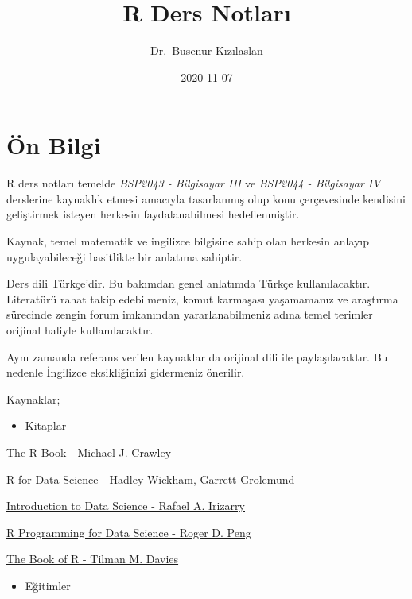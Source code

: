 \documentclass[
]{book}
\title{R Ders Notları}
\author{Dr.~Busenur Kızılaslan}
\date{2020-11-07}
\providecommand{\tightlist}{%
  \setlength{\itemsep}{0pt}\setlength{\parskip}{0pt}}
\begin{document}
\maketitle

{
\setcounter{tocdepth}{1}
\tableofcontents
}
\hypertarget{uxf6n-bilgi}{%
\chapter{Ön Bilgi}\label{uxf6n-bilgi}}

R ders notları temelde \emph{BSP2043 - Bilgisayar III} ve \emph{BSP2044 - Bilgisayar IV} derslerine kaynaklık etmesi amacıyla tasarlanmış olup konu çerçevesinde kendisini geliştirmek isteyen herkesin faydalanabilmesi hedeflenmiştir.

Kaynak, temel matematik ve ingilizce bilgisine sahip olan herkesin anlayıp uygulayabileceği basitlikte bir anlatıma sahiptir.

Ders dili Türkçe'dir. Bu bakımdan genel anlatımda Türkçe kullanılacaktır. Literatürü rahat takip edebilmeniz, komut karmaşası yaşamamanız ve araştırma sürecinde zengin forum imkanından yararlanabilmeniz adına temel terimler orijinal haliyle kullanılacaktır.

Aynı zamanda referans verilen kaynaklar da orijinal dili ile paylaşılacaktır. Bu nedenle İngilizce eksikliğinizi gidermeniz önerilir.

Kaynaklar;

\begin{itemize}
\tightlist
\item
  Kitaplar
\end{itemize}

\href{https://www.cs.upc.edu/~robert/teaching/estadistica/TheRBook.pdf}{The R Book - Michael J. Crawley}

\href{https://r4ds.had.co.nz}{R for Data Science - Hadley Wickham, Garrett Grolemund}

\href{https://rafalab.github.io/dsbook/}{Introduction to Data Science - Rafael A. Irizarry}

\href{https://bookdown.org/rdpeng/rprogdatascience/}{R Programming for Data Science - Roger D. Peng}

\href{https://web.itu.edu.tr/~tokerem/The_Book_of_R.pdf}{The Book of R - Tilman M. Davies}

\begin{itemize}
\tightlist
\item
  Eğitimler
\end{itemize}
\end{document}
